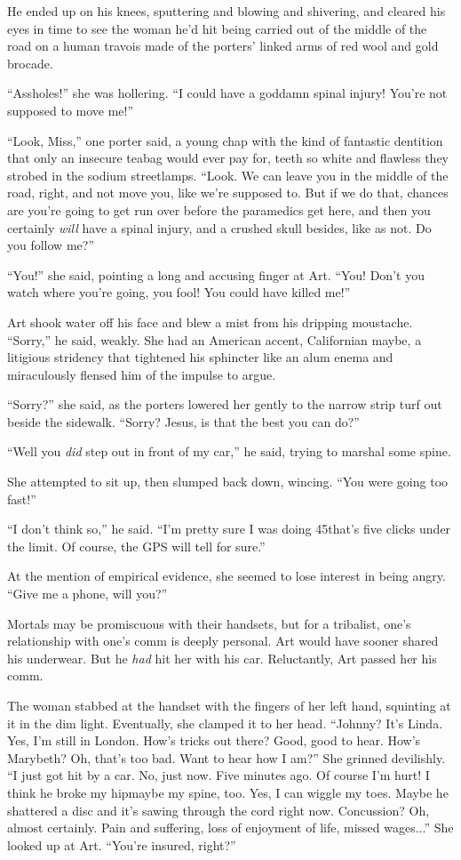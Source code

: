 He ended up on his knees, sputtering and blowing and shivering, and
cleared his eyes in time to see the woman he’d hit being carried
out of the middle of the road on a human travois made of the
porters’ linked arms of red wool and gold brocade.

“Assholes!” she was hollering. “I could have a goddamn spinal
injury! You’re not supposed to move me!”

“Look, Miss,” one porter said, a young chap with the kind of
fantastic dentition that only an insecure teabag would ever pay
for, teeth so white and flawless they strobed in the sodium
streetlamps. “Look. We can leave you in the middle of the road,
right, and not move you, like we’re supposed to. But if we do that,
chances are you’re going to get run over before the paramedics get
here, and then you certainly \emph{will} have a spinal injury, and
a crushed skull besides, like as not. Do you follow me?”

“You!” she said, pointing a long and accusing finger at Art. “You!
Don’t you watch where you’re going, you fool! You could have killed
me!”

Art shook water off his face and blew a mist from his dripping
moustache. “Sorry,” he said, weakly. She had an American accent,
Californian maybe, a litigious stridency that tightened his
sphincter like an alum enema and miraculously flensed him of the
impulse to argue.

“Sorry?” she said, as the porters lowered her gently to the narrow
strip turf out beside the sidewalk. “Sorry? Jesus, is that the best
you can do?”

“Well you \emph{did} step out in front of my car,” he said, trying
to marshal some spine.

She attempted to sit up, then slumped back down, wincing. “You were
going too fast!”

“I don’t think so,” he said. “I’m pretty sure I was doing 45{\dash}that’s
five clicks under the limit. Of course, the GPS will tell for
sure.”

At the mention of empirical evidence, she seemed to lose interest
in being angry. “Give me a phone, will you?”

Mortals may be promiscuous with their handsets, but for a
tribalist, one’s relationship with one’s comm is deeply personal.
Art would have sooner shared his underwear. But he \emph{had} hit
her with his car. Reluctantly, Art passed her his comm.

The woman stabbed at the handset with the fingers of her left hand,
squinting at it in the dim light. Eventually, she clamped it to her
head. “Johnny? It’s Linda. Yes, I’m still in London. How’s tricks
out there? Good, good to hear. How’s Marybeth? Oh, that’s too bad.
Want to hear how I am?” She grinned devilishly. “I just got hit by
a car. No, just now. Five minutes ago. Of course I’m hurt! I think
he broke my hip{\dash}maybe my spine, too. Yes, I can wiggle my toes.
Maybe he shattered a disc and it’s sawing through the cord right
now. Concussion? Oh, almost certainly. Pain and suffering, loss of
enjoyment of life, missed wages...” She looked up at Art. “You’re
insured, right?”

